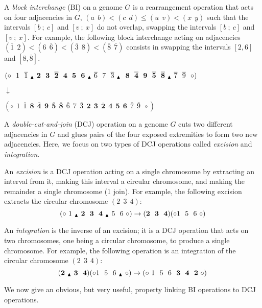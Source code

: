 \documentclass{llncs}
\newcommand{\breakpoint}{ \textsubscript{$\textcolor{black}{\blacktriangle}$} }
\newcommand{\fst}[1]{ \ensuremath{#1} }
\newcommand{\snd}[1]{ \ensuremath{\overline{#1}} }
\def\bi{\ensuremath{\mbox{BI}}}
\begin{document}
A \emph{block interchange} (\bi) on a genome $G$ is a rearrangement 
operation that acts on four adjacencies in $G$, 
$(a~~b) <  (c~~d) \leq (u~~v) < (x~~y)$ such that the intervals $[b~;~c]$ and 
$[v~;~x]$ do not overlap, swapping the intervals $[b~;~c]$ and $[v~;~x]$.
For example, the following block interchange acting on adjacencies $(\snd{1}~~\fst{2})< (\fst{6}~~\snd{6})< (\snd{3}~~\fst{8})< (\snd{8}~~\snd{7})$
consists in swapping the intervals $[\fst{2},\fst{6}]$ and $[\fst{8},\snd{8}]$. 
\begin{center}
$(\circ~~\fst{1}~~\snd{1}~\breakpoint~\mathbf{\fst{2}~~\fst{3}~~\snd{2}~~\fst{4}~~\fst{5}~~\fst{6}} ~\breakpoint~\snd{6}~~\fst{7}~~\snd{3} ~\breakpoint~~\mathbf{\fst{8}~~\snd{4}~~\fst{9}~~\snd{5}~~\snd{8}}~ \breakpoint~\snd{7}~~\snd{9}~~\circ)$

$\downarrow$

$(\circ~~\fst{1}~~\snd{1}~~\mathbf{\fst{8}~~\snd{4}~~\fst{9}~~\snd{5}~~\snd{8}}~~\snd{6}~~\fst{7}~~\snd{3}~~\mathbf{\fst{2}~~\fst{3}~~\snd{2}~~\fst{4}~~\fst{5}~~\fst{6}}~~\snd{7}~~\snd{9}~~\circ)$
\end{center}

A \emph{double-cut-and-join} (DCJ) operation on a genome $G$ cuts two different 
adjacencies in $G$ and glues pairs of the four exposed extremities to form two 
new adjacencies. 
Here, we focus on two types of DCJ operations called \emph{excision} and \emph{integration}.

An \emph{excision} is a DCJ operation acting on a single chromosome by extracting an interval from it, making this interval a circular chromosome, and making the remainder a single chromosome (1 join). For example, the following excision extracts the circular chromosome $(\fst{2}~~\fst{3}~~\fst{4})$:
$$(\circ~\fst{1}~\breakpoint~\mathbf{\fst{2}~~\fst{3}~~\fst{4}}~\breakpoint~\fst{5}~~\fst{6}~\circ) \rightarrow (\mathbf{\fst{2}~~\fst{3}~~\fst{4}}) (\circ \fst{1}~~\fst{5}~~\fst{6}~\circ)$$ 

An \emph{integration} is the inverse of an excision; it is a DCJ operation that acts on two chromosomes, one being a circular chromosome, to produce a single chromosome.  For example, the following operation is an integration of the circular chromosome $(\fst{2}~~\fst{3}~~\fst{4})$:
$$\mathbf{(\fst{2}~\breakpoint~\fst{3}~~\fst{4}}) (\circ \fst{1}~~\fst{5}~~\fst{6}~\breakpoint~\circ) \rightarrow (\circ~\fst{1}~~\fst{5}~~\fst{6}~~\mathbf{\fst{3}~~\fst{4}~~\fst{2}}~\circ)$$

We now give an obvious, but very useful, property linking BI operations to DCJ operations.
\end{document}
